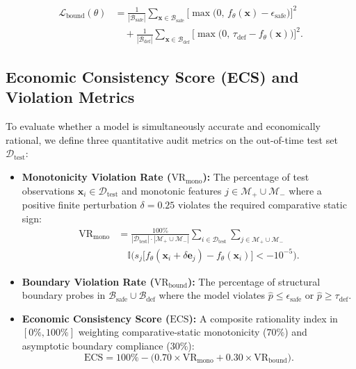 \documentclass[pdflatex,sn-mathphys-num,twocolumn]{sn-jnl}
\theoremstyle{thmstyleone}
\theoremstyle{thmstyletwo}
\theoremstyle{thmstylethree}
\begin{document}
\begin{equation}
\begin{aligned}
    \mathcal{L}_{\text{bound}}(\theta) &= \frac{1}{|\mathcal{B}_{\text{safe}}|} \sum_{\mathbf{x} \in \mathcal{B}_{\text{safe}}} \Big[\max\big(0, \, f_\theta(\mathbf{x}) - \epsilon_{\text{safe}}\big)\Big]^2 \\
    &\quad + \frac{1}{|\mathcal{B}_{\text{def}}|} \sum_{\mathbf{x} \in \mathcal{B}_{\text{def}}} \Big[\max\big(0, \, \tau_{\text{def}} - f_\theta(\mathbf{x})\big)\Big]^2.
\end{aligned}
\end{equation}

\subsection{Economic Consistency Score (ECS) and Violation Metrics}
To evaluate whether a model is simultaneously accurate and economically rational, we define three quantitative audit metrics on the out-of-time test set $\mathcal{D}_{\text{test}}$:
\begin{itemize}
    \item \textbf{Monotonicity Violation Rate ($\text{VR}_{\text{mono}}$):} The percentage of test observations $\mathbf{x}_i \in \mathcal{D}_{\text{test}}$ and monotonic features $j \in \mathcal{M}_+ \cup \mathcal{M}_-$ where a positive finite perturbation $\delta = 0.25$ violates the required comparative static sign:
    \begin{equation}
    \begin{aligned}
        \text{VR}_{\text{mono}} &= \frac{100\%}{|\mathcal{D}_{\text{test}}| \cdot |\mathcal{M}_+ \cup \mathcal{M}_-|} \sum_{i \in \mathcal{D}_{\text{test}}} \sum_{j \in \mathcal{M}_+ \cup \mathcal{M}_-} \\
        &\quad \mathbb{I}\Big( s_j \big[f_\theta(\mathbf{x}_i + \delta \mathbf{e}_j) - f_\theta(\mathbf{x}_i)\big] < -10^{-5} \Big).
    \end{aligned}
    \end{equation}
    \item \textbf{Boundary Violation Rate ($\text{VR}_{\text{bound}}$):} The percentage of structural boundary probes in $\mathcal{B}_{\text{safe}} \cup \mathcal{B}_{\text{def}}$ where the model violates $\hat{p} \le \epsilon_{\text{safe}}$ or $\hat{p} \ge \tau_{\text{def}}$.
    \item \textbf{Economic Consistency Score ($\text{ECS}$):} A composite rationality index in $[0\%, 100\%]$ weighting comparative-static monotonicity ($70\%$) and asymptotic boundary compliance ($30\%$):
    \begin{equation}
        \text{ECS} = 100\% - \Big( 0.70 \times \text{VR}_{\text{mono}} + 0.30 \times \text{VR}_{\text{bound}} \Big).
    \end{equation}
\end{itemize}
\end{document}
